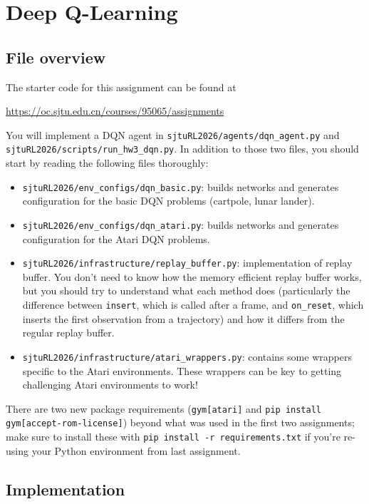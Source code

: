 \section{Deep Q-Learning}

\subsection{File overview}
The starter code for this assignment can be found at

\begin{centering}
\url{https://oc.sjtu.edu.cn/courses/95065/assignments} \\
\end{centering}
\vspace{.35cm}

You will implement a DQN agent in \verb|sjtuRL2026/agents/dqn_agent.py| and \verb|sjtuRL2026/scripts/run_hw3_dqn.py|. In addition to those two files, you should start by reading the following files thoroughly:
\begin{itemize}
    \item \verb|sjtuRL2026/env_configs/dqn_basic.py|: builds networks and generates configuration for the basic DQN problems (cartpole, lunar lander).
    \item \verb|sjtuRL2026/env_configs/dqn_atari.py|: builds networks and generates configuration for the Atari DQN problems.
    \item \verb|sjtuRL2026/infrastructure/replay_buffer.py|: implementation of replay buffer. You don't need to know how the memory efficient replay buffer works, but you should try to understand what each method does (particularly the difference between \verb|insert|, which is called after a frame, and \verb|on_reset|, which inserts the first observation from a trajectory) and how it differs from the regular replay buffer.
    \item \verb|sjtuRL2026/infrastructure/atari_wrappers.py|: contains some wrappers specific to the Atari environments. These wrappers can be key to getting challenging Atari environments to work!
\end{itemize}

There are two new package requirements (\texttt{gym[atari]} and \texttt{pip install gym[accept-rom-license]}) beyond what was used in the first two assignments; make sure to install these with \texttt{pip install -r requirements.txt} if you're re-using your Python environment from last assignment.

\subsection{Implementation}

